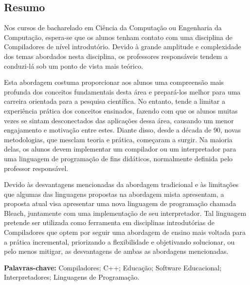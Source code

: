 \thispagestyle{empty}
\begin{spacing}{1.0}
\chapter*{Resumo}
Nos cursos de bacharelado em Ciência da Computação ou Engenharia da Computação, espera-se que os alunos tenham contato com uma disciplina de Compiladores de nível introdutório. Devido à grande amplitude e complexidade dos temas abordados nesta disciplina, os professores responsáveis tendem a conduzi-lá sob um ponto de vista mais teórico. 

Esta abordagem costuma proporcionar aos alunos uma compreensão mais profunda dos conceitos fundamentais desta área e prepará-los melhor para uma carreira orientada para a pesquisa científica. No entanto, tende a limitar a experiência prática dos conceitos ensinados, fazendo com que os alunos muitas vezes se sintam desconectados das aplicações dessa área, causando um menor engajamento e motivação entre estes. Diante disso, desde a década de 90, novas metodologias, que mesclam teoria e prática, começaram a surgir. Na maioria delas, os alunos devem implementar um compilador ou um interpretador para uma linguagem de programação de fins didáticos, normalmente definida pelo professor responsável.

Devido às desvantagens mencionadas da abordagem tradicional e às limitações que algumas das linguagens propostas na abordagem mista apresentam, a proposta atual visa apresentar uma nova linguagem de programação chamada Bleach, juntamente com uma implementação de seu interpretador. Tal linguagem pretende ser utilizada como ferramenta em disciplinas introdutórias de Compiladores que optem por seguir uma abordagem de ensino mais voltada para a prática incremental, priorizando a flexibilidade e objetivando solucionar, ou pelo menos mitigar, as desvantagens de ambas as abordagens mencionadas.

\textbf{Palavras-chave:} Compiladores; C++; Educação; Software Educacional; Interpretadores; Linguagens de Programação.
        
\clearpage
\end{spacing}
